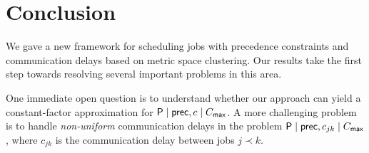 \section*{Conclusion}
We gave a new framework for scheduling jobs with precedence constraints and communication delays based on metric space clustering.
Our results take the first step towards resolving several important problems in this area. 

One immediate open question is to understand whether our approach can yield a constant-factor approximation for $\mathsf{P} \mid \mathsf{prec}, c \mid C_{\mathsf{max}}$.
A more challenging problem is to handle {\em non-uniform} communication delays in 
the problem $\mathsf{P} \mid \mathsf{prec}, c_{jk} \mid C_{\mathsf{max}}$, where $c_{jk}$ is the communication delay between jobs $j \prec k$.







\newpage
